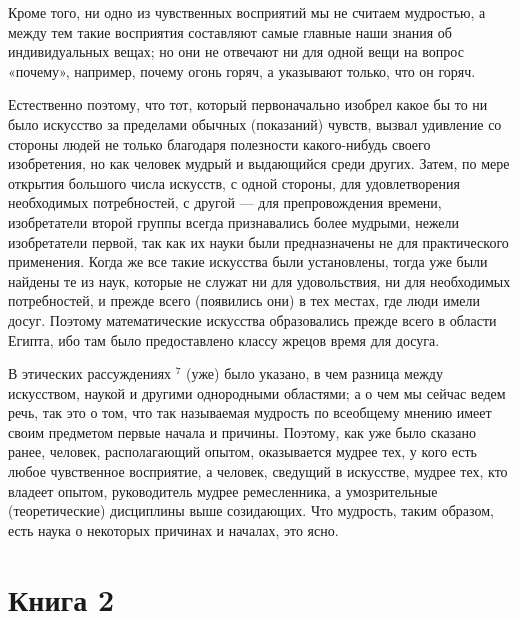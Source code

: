 \documentclass[oneside, 17pt, dvipsnames]{extbook}
\newcommand{\alignedmarginpar}[1]{
  \leavevmode
  \marginpar{\footnotesize #1}
  \ignorespaces
}
\begin{document}
Кроме того, ни одно из чувственных восприятий мы не считаем мудростью, а между тем такие восприятия составляют самые главные наши знания об индивидуальных вещах; но они не отвечают ни для одной вещи на вопрос «почему», например, почему огонь горяч, а указывают только, что он горяч.

Естественно поэтому, что тот, который первоначально изобрел какое бы то ни было искусство за пределами обычных (показаний) чувств, вызвал удивление со стороны людей не только благодаря полезности какого-нибудь своего изобретения, но как человек мудрый и выдающийся среди других. Затем, по мере открытия большого числа искусств, с одной стороны, для удовлетворения необходимых потребностей, с другой — для препровождения времени, изобретатели второй группы всегда признавались более мудрыми, нежели изобретатели первой, так как их науки были предназначены не для практического применения. Когда же все такие искусства были установлены, тогда уже были найдены те из наук, которые не служат ни для удовольствия, ни для необходимых потребностей, и прежде всего (появились они) в тех местах, где люди имели досуг. Поэтому математические искусства образовались прежде всего в области Египта, ибо там было предоставлено классу жрецов время для досуга.

\alignedmarginpar{$^7$ Никомахова этика VI, главы 3—7.}
В этических рассуждениях $^7$ (уже) было указано, в чем разница между искусством, наукой и другими однородными областями; а о чем мы сейчас ведем речь, так это о том, что так называемая мудрость по всеобщему мнению имеет своим предметом первые начала и причины. Поэтому, как уже было сказано ранее, человек, располагающий опытом, оказывается мудрее тех, у кого есть любое чувственное восприятие, а человек, сведущий в искусстве, мудрее тех, кто владеет опытом, руководитель мудрее ремесленника, а умозрительные (теоретические) дисциплины выше созидающих. Что мудрость, таким образом, есть наука о некоторых причинах и началах, это ясно.




\newpage
\section{Книга 2}
\end{document}
